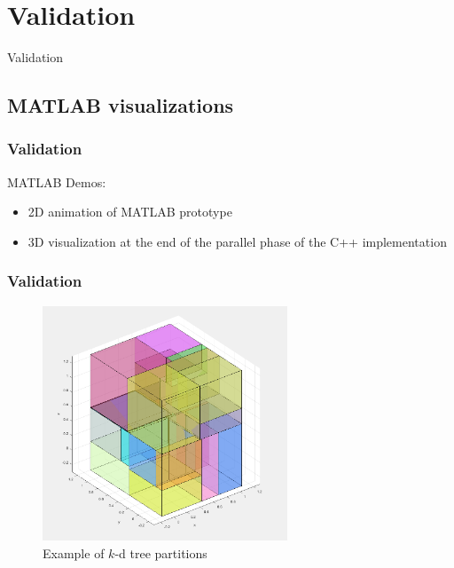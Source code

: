 \documentclass[usernames,dvipsnames]{beamer}
\begin{document}
\section{Validation}

\begin{frame}	
	\begin{Huge}
		\begin{center}
			Validation
		\end{center}
	\end{Huge}
\end{frame}

\subsection{MATLAB visualizations}

\begin{frame}	
	\frametitle{Validation}
	
	\begin{block}{MATLAB Demos:}
		\begin{itemize}
			\item 2D animation of MATLAB prototype
			\item 3D visualization at the end of the parallel phase of the C++ implementation
		\end{itemize}
	\end{block}
	
\end{frame}

\begin{frame}	
	\frametitle{Validation}
	\vspace{-8pt}
	\begin{figure}
		\centering
		\includegraphics[width=0.65\textwidth]{images/squares.png}
		\vspace{-15pt}
		\caption{Example of $k$-d tree partitions}
	\end{figure}
	
\end{frame}
\end{document}
